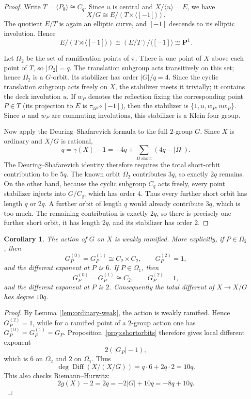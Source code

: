 \documentclass[11pt]{article}
\newtheorem{corollary}[theorem]{Corollary}
\theoremstyle{remark}
\begin{document}
\begin{proof}
Write $T=\langle P_0\rangle\cong C_q$.  Since $u$ is central and
$X/\langle u\rangle=E$, we have
\[
 X/G\cong E/(T\rtimes\langle[-1]\rangle).
\]
The quotient $E/T$ is again an elliptic curve, and $[-1]$ descends to its
elliptic involution.  Hence
\[
 E/(T\rtimes\langle[-1]\rangle)
 \cong (E/T)/\langle[-1]\rangle\cong\mathbf P^1.
\]

Let $\Omega_2$ be the set of ramification points of $\pi$.  There is one
point of $X$ above each point of $T$, so $|\Omega_2|=q$.  The translation
subgroup acts transitively on this set; hence $\Omega_2$ is a $G$-orbit.
Its stabilizer has order $|G|/q=4$.  Since the cyclic translation subgroup
acts freely on $X$, the stabilizer meets it trivially; it contains the
deck involution $u$.  If $w_P$ denotes the reflection fixing the
corresponding point $P\in T$ (its projection to $E$ is
$\tau_{2P}\circ[-1]$), then the stabilizer is
$\{1,u,w_P,uw_P\}$.  Since $u$ and $w_P$ are commuting involutions, this
stabilizer is a Klein four group.

Now apply the Deuring--Shafarevich formula to the full $2$-group $G$.
Since $X$ is ordinary and $X/G$ is rational,
\[
 q=\gamma(X)-1
   =-4q+\sum_{\Omega\text{ short}}(4q-|\Omega|).
\]
The Deuring--Shafarevich identity therefore requires the total
short-orbit contribution to be $5q$.  The known orbit $\Omega_2$
contributes $3q$, so exactly $2q$ remains.  On the other hand, because the
cyclic subgroup $C_q$ acts freely, every point stabilizer injects into
$G/C_q$, which has order $4$.  Thus every further short orbit has length
$q$ or $2q$.  A further orbit of length $q$ would already contribute
$3q$, which is too much.  The remaining contribution is exactly $2q$,
so there is precisely one further short orbit, it has length $2q$, and its
stabilizer has order $2$.
\end{proof}

\begin{corollary}\label{cor:weakram}
The action of $G$ on $X$ is weakly ramified.  More explicitly, if
$P\in\Omega_2$, then
\[
 G_P^{(0)}=G_P^{(1)}\cong C_2\times C_2,
 \qquad G_P^{(2)}=1,
\]
and the different exponent at $P$ is $6$.  If $P\in\Omega_1$, then
\[
 G_P^{(0)}=G_P^{(1)}\cong C_2,
 \qquad G_P^{(2)}=1,
\]
and the different exponent at $P$ is $2$.  Consequently the total
different of $X\to X/G$ has degree $10q$.
\end{corollary}

\begin{proof}
By Lemma~\ref{lem:ordinary-weak}, the action is weakly ramified.  Hence
$G_P^{(2)}=1$, while for a ramified point of a $2$-group action one has
$G_P^{(0)}=G_P^{(1)}=G_P$.  Proposition~\ref{prop:shortorbits} therefore
gives local different exponent
\[
        2(|G_P|-1),
\]
which is $6$ on $\Omega_2$ and $2$ on $\Omega_1$.  Thus
\[
 \deg\operatorname{Diff}(X/(X/G))
   =q\cdot6+2q\cdot2=10q.
\]
This also checks Riemann--Hurwitz:
\[
 2g(X)-2=2q=-2|G|+10q=-8q+10q.
\]
\end{proof}
\end{document}
